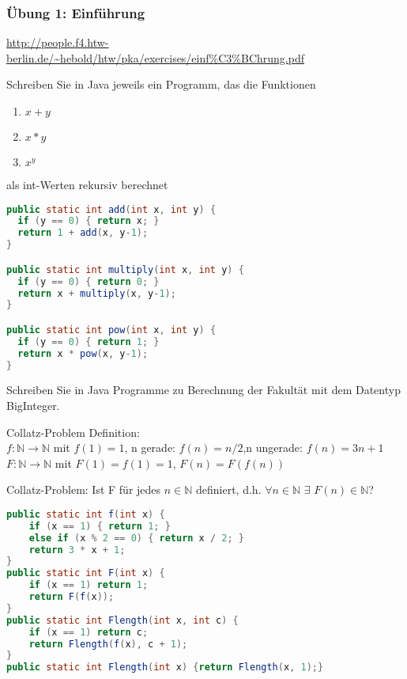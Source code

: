 \begin{card}
	\frametitle{Übung 1: Einführung}
	\url{http://people.f4.htw-berlin.de/~hebold/htw/pka/exercises/einf\%C3\%BChrung.pdf}
\end{card}

\begin{card}
	Schreiben Sie in Java jeweils ein Programm, das die Funktionen
	\begin{enumerate}
	\item $x+y$
	\item $x*y$
	\item $x^y$
	\end{enumerate}
	als int-Werten rekursiv berechnet
	\hr
	\begin{lstlisting}[language=Java]
public static int add(int x, int y) {
  if (y == 0) { return x; }
  return 1 + add(x, y-1);
}

public static int multiply(int x, int y) {
  if (y == 0) { return 0; }
  return x + multiply(x, y-1);
}

public static int pow(int x, int y) {
  if (y == 0) { return 1; }
  return x * pow(x, y-1);
}
	\end{lstlisting}	
\end{card}

\begin{card}
	Schreiben Sie in Java Programme zu Berechnung der Fakultät mit dem Datentyp BigInteger.
\end{card}

\begin{card}
	Collatz-Problem Definition:\\
	$f: \mathbb{N} \rightarrow \mathbb{N}$ mit 
	$f(1) = 1$, n gerade: $f(n) = n / 2$,n ungerade: $f(n) = 3n + 1$\\
	$F: \mathbb{N} \rightarrow \mathbb{N}$ mit $F(1) = f(1)  = 1$, $F(n) = F(f(n))$
	
	Collatz-Problem: Ist F für jedes $n \in \mathbb{N}$  definiert, d.h. $\forall n \in \mathbb{N}$ $\exists$ $F(n) \in \mathbb{N}$?
	\hr
	\begin{lstlisting}[language=Java]
public static int f(int x) { 
    if (x == 1) { return 1; } 
    else if (x % 2 == 0) { return x / 2; }
    return 3 * x + 1;
} 
public static int F(int x) { 
    if (x == 1) return 1; 
    return F(f(x)); 
}
public static int Flength(int x, int c) { 
    if (x == 1) return c; 
    return Flength(f(x), c + 1); 
}
public static int Flength(int x) {return Flength(x, 1);}
	\end{lstlisting}
\end{card}

